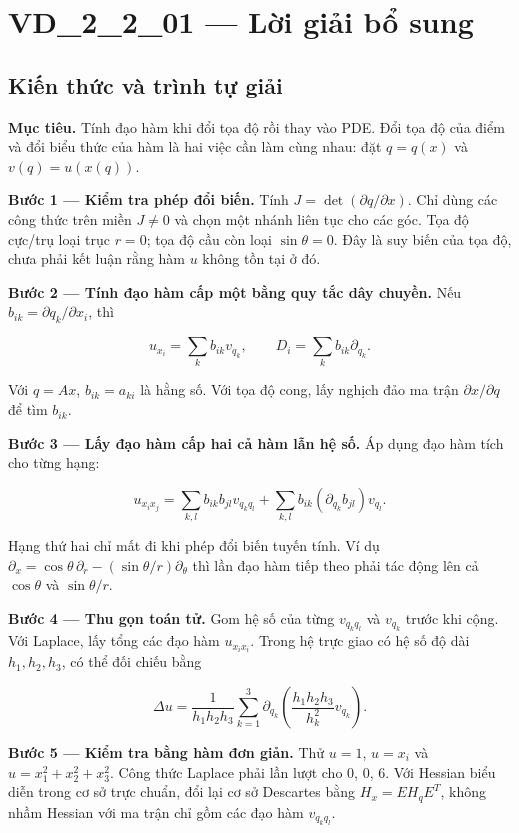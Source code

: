 \documentclass[10pt,a4paper]{article}
\begin{document}
\section*{VD\_2\_2\_01 — Lời giải bổ sung}
\subsection*{Kiến thức và trình tự giải}
\textbf{Mục tiêu.} Tính đạo hàm khi đổi tọa độ rồi thay vào PDE. Đổi tọa độ của điểm và đổi biểu thức của hàm là hai việc cần làm cùng nhau: đặt $q=q(x)$ và $v(q)=u(x(q))$.

\textbf{Bước 1 — Kiểm tra phép đổi biến.} Tính $J=\det(\partial q/\partial x)$. Chỉ dùng các công thức trên miền $J\ne0$ và chọn một nhánh liên tục cho các góc. Tọa độ cực/trụ loại trục $r=0$; tọa độ cầu còn loại $\sin\theta=0$. Đây là suy biến của tọa độ, chưa phải kết luận rằng hàm $u$ không tồn tại ở đó.

\textbf{Bước 2 — Tính đạo hàm cấp một bằng quy tắc dây chuyền.} Nếu $b_{ik}=\partial q_k/\partial x_i$, thì


\[
u_{x_i}=\sum_k b_{ik}v_{q_k},\qquad D_i=\sum_k b_{ik}\partial_{q_k}.
\]


Với $q=Ax$, $b_{ik}=a_{ki}$ là hằng số. Với tọa độ cong, lấy nghịch đảo ma trận $\partial x/\partial q$ để tìm $b_{ik}$.

\textbf{Bước 3 — Lấy đạo hàm cấp hai cả hàm lẫn hệ số.} Áp dụng đạo hàm tích cho từng hạng:


\[
u_{x_ix_j}=\sum_{k,l}b_{ik}b_{jl}v_{q_kq_l}
+\sum_{k,l}b_{ik}(\partial_{q_k}b_{jl})v_{q_l}.
\]


Hạng thứ hai chỉ mất đi khi phép đổi biến tuyến tính. Ví dụ $\partial_x=\cos\theta\,\partial_r-(\sin\theta/r)\partial_\theta$ thì lần đạo hàm tiếp theo phải tác động lên cả $\cos\theta$ và $\sin\theta/r$.

\textbf{Bước 4 — Thu gọn toán tử.} Gom hệ số của từng $v_{q_kq_l}$ và $v_{q_k}$ trước khi cộng. Với Laplace, lấy tổng các đạo hàm $u_{x_ix_i}$. Trong hệ trực giao có hệ số độ dài $h_1,h_2,h_3$, có thể đối chiếu bằng


\[
\Delta u=\frac1{h_1h_2h_3}\sum_{k=1}^3
\partial_{q_k}\left(\frac{h_1h_2h_3}{h_k^2}v_{q_k}\right).
\]


\textbf{Bước 5 — Kiểm tra bằng hàm đơn giản.} Thử $u=1$, $u=x_i$ và $u=x_1^2+x_2^2+x_3^2$. Công thức Laplace phải lần lượt cho $0$, $0$, $6$. Với Hessian biểu diễn trong cơ sở trực chuẩn, đổi lại cơ sở Descartes bằng $H_x=E H_q E^T$, không nhầm Hessian với ma trận chỉ gồm các đạo hàm $v_{q_kq_l}$.
\end{document}
